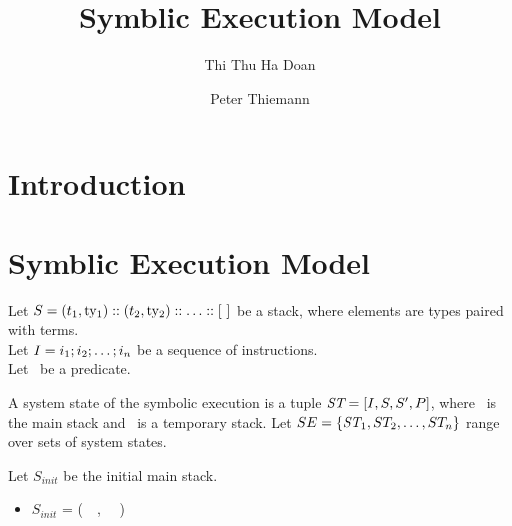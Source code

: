 \documentclass[runningheads]{llncs}
\newcommand\pt{\todo[author=PT,inline]}
\begin{document}
%
\title{Symblic Execution Model}
%
%
\author{Thi Thu Ha Doan\and
  Peter Thiemann}

%
%
%
\maketitle              %
%
\begin{abstract}
 

\keywords{}
\end{abstract}

%
%
%
\section{Introduction}
\label{sec:introduction}

\section{Symblic Execution Model}
\label{sec:symblic-execution-model}

Let $\STACK = (\TermOne, \TYF) \STACKCONCAT (\TermTwo, \TYS) \STACKCONCAT \DOT
\STACKCONCAT \EMPTYSTACK$ be a stack, where elements are types paired with terms.
\\
Let $I = i_1; i_2; \dots; i_n$ be a sequence of instructions. 
\\
Let \PREDICATE\ be a predicate. 

\begin{definition}
A system state of the symbolic execution is a tuple $\textit{ST} =
[I, S, S', P]$, where \STACK\ is the main stack and \TSTACK\ is a temporary stack. Let $\text{$SE$} = \{\textit{ST}_1, \text{$ST_2$}, \dots, \text{$ST_n$} \}$ range over sets of system states.
\end{definition}

Let $S_{init}$  be the initial main stack.
\begin{itemize}
\item[]  $S_{init}$ = (\KPAIR\ \VPAR\ \VSTORAGE, \TPAIR\ \TYF\ \TYS) \STACKCONCAT\ \EMPTYSTACK
\end{itemize}
\end{document}
